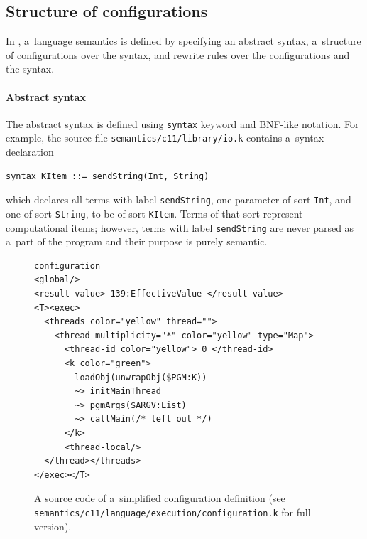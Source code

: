 \documentclass{fithesis3}
\begin{document}
\subsection{Structure of configurations}


In \K, a~language semantics is defined by specifying an abstract syntax, a~structure of configurations over the syntax, and rewrite rules over the configurations and the syntax.

\paragraph{Abstract syntax}
The abstract syntax is defined using \texttt{syntax} keyword and BNF-like notation. For example, the
source file \texttt{semantics/c11/library/io.k} contains a~syntax declaration
\begin{lstlisting}
syntax KItem ::= sendString(Int, String)
\end{lstlisting}
which declares all terms with label \texttt{sendString}, one parameter of sort \texttt{Int}, and one of sort \texttt{String}, to be of sort \texttt{KItem}. Terms of that sort represent computational items; however, terms with label \texttt{sendString} are never parsed as a~part of the program and their purpose is purely semantic. 


\begin{figure}
\begin{lstlisting}
configuration
<global/>
<result-value> 139:EffectiveValue </result-value>
<T><exec>
  <threads color="yellow" thread="">
    <thread multiplicity="*" color="yellow" type="Map">
      <thread-id color="yellow"> 0 </thread-id>
      <k color="green">
        loadObj(unwrapObj($PGM:K))
        ~> initMainThread
        ~> pgmArgs($ARGV:List)
        ~> callMain(/* left out */)
      </k>
      <thread-local/>
  </thread></threads>
</exec></T>
\end{lstlisting}
\caption{A source code of a~simplified configuration definition (see \texttt{semantics/c11/language/execution/configuration.k} for full version).}
\label{exampleConfigurationDefinition}
\end{figure}
\end{document}
